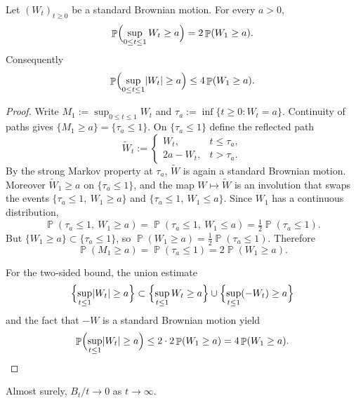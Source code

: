 \documentclass[11pt,a4paper]{article}
\DeclareMathOperator{\Pbb}{\mathbb{P}}
\begin{document}
\begin{lemma}
\label{lem:p5a-reflection}
Let \((W_t)_{t\ge 0}\) be a standard Brownian motion. For every \(a>0\),
\[
\Pbb\Bigl(\sup_{0\le t\le 1}W_t\ge a\Bigr)
=
2\Pbb(W_1\ge a).
\]
Consequently
\[
\Pbb\Bigl(\sup_{0\le t\le 1}\lvert W_t\rvert\ge a\Bigr)
\le
4\Pbb(W_1\ge a).
\]
\end{lemma}

\begin{proof}
Write \(M_1:=\sup_{0\le t\le 1}W_t\) and \(\tau_a:=\inf\{t\ge 0:W_t=a\}\). Continuity of paths gives \(\{M_1\ge a\}=\{\tau_a\le 1\}\). On \(\{\tau_a\le 1\}\) define the reflected path
\[
\widetilde W_t
:=
\begin{cases}
W_t,& t\le\tau_a,\\
2a-W_t,& t>\tau_a.
\end{cases}
\]
By the strong Markov property at \(\tau_a\), \(\widetilde W\) is again a standard Brownian motion. Moreover \(\widetilde W_1\ge a\) on \(\{\tau_a\le 1\}\), and the map \(W\mapsto\widetilde W\) is an involution that swaps the events \(\{\tau_a\le 1,\ W_1\ge a\}\) and \(\{\tau_a\le 1,\ W_1\le a\}\). Since \(W_1\) has a continuous distribution,
\[
\Pbb(\tau_a\le 1,\ W_1\ge a)
=
\Pbb(\tau_a\le 1,\ W_1\le a)
=
\tfrac12\Pbb(\tau_a\le 1).
\]
But \(\{W_1\ge a\}\subset\{\tau_a\le 1\}\), so \(\Pbb(W_1\ge a)=\frac12\Pbb(\tau_a\le 1)\). Therefore
\[
\Pbb(M_1\ge a)=\Pbb(\tau_a\le 1)=2\Pbb(W_1\ge a).
\]

For the two-sided bound, the union estimate
\[
\Bigl\{\sup_{t\le 1}\lvert W_t\rvert\ge a\Bigr\}
\subset
\Bigl\{\sup_{t\le 1}W_t\ge a\Bigr\}
\cup
\Bigl\{\sup_{t\le 1}(-W_t)\ge a\Bigr\}
\]
and the fact that \(-W\) is a standard Brownian motion yield
\[
\Pbb\Bigl(\sup_{t\le 1}\lvert W_t\rvert\ge a\Bigr)
\le
2\cdot 2\Pbb(W_1\ge a)
=
4\Pbb(W_1\ge a).
\]
\end{proof}

\begin{lemma}
\label{lem:p5a-slln}
Almost surely, \(B_t/t\to 0\) as \(t\to\infty\).
\end{lemma}
\end{document}
